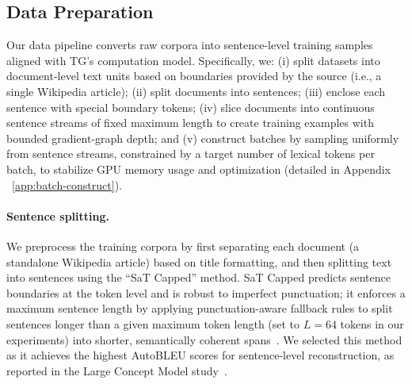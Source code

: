 \documentclass{article}
\begin{document}
\subsection{Data Preparation}
\label{sec:data-pipeline}


Our data pipeline converts raw corpora into sentence-level training samples aligned with TG’s computation model. Specifically, we: (i) split datasets into document-level text units based on boundaries provided by the source (i.e., a single Wikipedia article); (ii) split documents into sentences; (iii) enclose each sentence with special boundary tokens; (iv) slice documents into continuous sentence streams of fixed maximum length to create training examples with bounded gradient-graph depth; and (v) construct batches by sampling uniformly from sentence streams, constrained by a target number of lexical tokens per batch, to stabilize GPU memory usage and optimization (detailed in Appendix ~\ref{app:batch-construct}). 

\paragraph{Sentence splitting.}
We preprocess the training corpora by first separating each document (a standalone Wikipedia article) based on title formatting, and then splitting text into sentences using the “SaT Capped'' method. SaT Capped predicts sentence boundaries at the token level and is robust to imperfect punctuation; it enforces a maximum sentence length by applying punctuation-aware fallback rules to split sentences longer than a given maximum token length (set to $L\!=\!64$ tokens in our experiments) into shorter, semantically coherent spans~\citep{Frohmann2024SaT,Minixhofer2023WtP,LCM2024}. We selected this method as it achieves the highest AutoBLEU scores for sentence-level reconstruction, as reported in the Large Concept Model study~\citep{LCM2024}.
\end{document}
